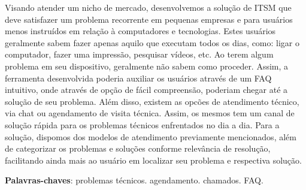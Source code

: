 
\setlength{\absparsep}{18pt} %
\begin{resumo}

Visando atender um nicho de mercado, desenvolvemos a solução de ITSM que deve satisfazer um problema recorrente em pequenas empresas e para usuários menos instruídos em relação à computadores e tecnologias. Estes usuários geralmente sabem fazer apenas aquilo que executam todos os dias, como: ligar o computador, fazer uma impressão, pesquisar vídeos, etc. Ao terem algum problema em seu dispositivo, geralmente não sabem como proceder. Assim, a ferramenta desenvolvida poderia auxiliar os usuários através de um FAQ intuitivo, onde através de opção de fácil compreensão, poderiam chegar até a solução de seu problema. Além disso, existem as opcões de atendimento técnico, via chat ou agendamento de visita técnica. Assim, os mesmos tem um canal de solução rápida para os problemas técnicos enfrentados no dia a dia. Para a solução, dispomos dos modelos de atendimento previamente mencionados, além de categorizar os problemas e soluções conforme relevância de resolução, facilitando ainda mais ao usuário em localizar seu problema e respectiva solução. 


 \textbf{Palavras-chaves}: problemas técnicos. agendamento. chamados. FAQ.
\end{resumo}

